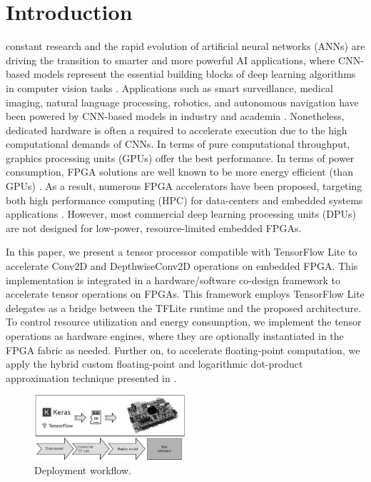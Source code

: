 
\section{Introduction}
\label{sec:introduction}
 constant research and the rapid evolution of artificial neural networks (ANNs) are driving the transition to smarter and more powerful AI applications, where CNN-based models represent the essential building blocks of deep learning algorithms in computer vision tasks \cite{hassaballah2020deep}. Applications such as smart surveillance, medical imaging, natural language processing, robotics, and autonomous navigation have been powered by CNN-based models in industry and academia \cite{dhillon2020convolutional}. Nonetheless, dedicated hardware is often a required to accelerate execution due to the high computational demands of CNNs. In terms of pure computational throughput, graphics processing units (GPUs) offer the best performance. In terms of power consumption, FPGA solutions are well known to be more energy efficient (than GPUs) \cite{nurvitadhi2017can}. As a result, numerous FPGA accelerators have been proposed, targeting both high performance computing (HPC) for data-centers and embedded systems applications \cite{abdelouahab2018accelerating, moini2017resource, guo2017angel}. However, most commercial deep learning processing units (DPUs) are not designed for low-power, resource-limited embedded FPGAs.

In this paper, we present a tensor processor compatible with TensorFlow Lite to accelerate Conv2D and DepthwiseConv2D operations on embedded FPGA. This implementation is integrated in a hardware/software co-design framework to accelerate tensor operations on FPGAs. This framework employs TensorFlow Lite delegates\cite{TensorFlowDelegate} as a bridge between the TFLite runtime and the proposed architecture. To control resource utilization and energy consumption, we implement the tensor operations as hardware engines, where they are optionally instantiated in the FPGA fabric as needed. Further on, to accelerate floating-point computation, we apply the hybrid custom floating-point and logarithmic dot-product approximation technique presented in \cite{nevarez2021accelerating}.

\begin{figure}[t!]
	\centering
	\includegraphics[width=0.5\textwidth]{../figures/workflow.pdf}
	\caption{Deployment workflow.}
	\label{fig:workflow}
\end{figure}

